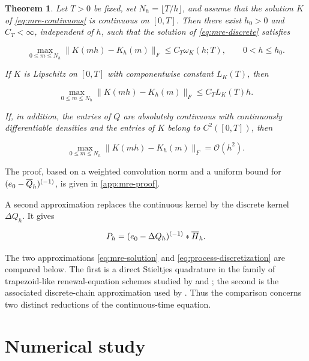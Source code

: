 \documentclass[3p,12pt,authoryear]{elsarticle}
\newtheorem{theorem}{Theorem}[section]
\theoremstyle{definition}
\theoremstyle{remark}
\newcommand{\ez}{e_{\mathstrut 0}}
\begin{document}
\begin{theorem}\label{thm:mre-global}
Let $T>0$ be fixed, set $N_h=\lfloor T/h\rfloor$, and assume that the solution $K$ of \eqref{eq:mre-continuous} is continuous on $[0,T]$. Then there exist $h_0>0$ and $C_T<\infty$, independent of $h$, such that the solution of \eqref{eq:mre-discrete} satisfies

\begin{equation}\label{eq:mre-global}
\max_{0\leq m\leq N_h}
\|K(mh)-K_h(m)\|_F
\leq
C_T\omega_K(h;T),
\qquad 0<h\leq h_0.
\end{equation}

If $K$ is Lipschitz on $[0,T]$ with componentwise constant $L_K(T)$, then

\begin{equation}\label{eq:mre-order-one}
\max_{0\leq m\leq N_h}
\|K(mh)-K_h(m)\|_F
\leq
C_TL_K(T)h.
\end{equation}

If, in addition, the entries of $Q$ are absolutely continuous with continuously differentiable densities and the entries of $K$ belong to $C^2([0,T])$, then

\begin{equation}\label{eq:mre-order-two}
\max_{0\leq m\leq N_h}
\|K(mh)-K_h(m)\|_F
=
\mathcal O(h^2).
\end{equation}

\end{theorem}

The proof, based on a weighted convolution norm and a uniform bound for $(\ez-\overline Q_h)^{(-1)}$, is given in \ref{app:mre-proof}.

A second approximation replaces the continuous kernel by the discrete kernel $\Delta Q_h$. It gives

\begin{equation}\label{eq:process-discretization}
P_h=(\ez-\Delta Q_h)^{(-1)}*\overline H_h.
\end{equation}

The two approximations \eqref{eq:mre-solution} and \eqref{eq:process-discretization} are compared below. The first is a direct Stieltjes quadrature in the family of trapezoid-like renewal-equation schemes studied by \citet{BoehmePreussWall1991} and \citet{Tortorella2005}; the second is the associated discrete-chain approximation used by \citet{WuMayaLimnios2021}. Thus the comparison concerns two distinct reductions of the continuous-time equation.

\section{Numerical study}\label{sec:numerics}
\end{document}
